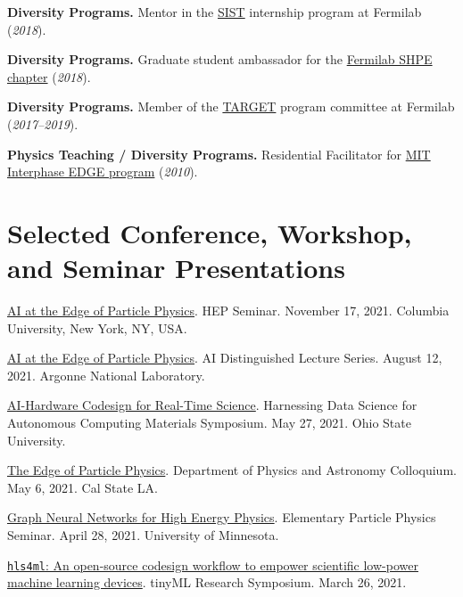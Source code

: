 \documentclass{res}
\newcommand{\MarginText}[1]{\section{#1}\vspace{10pt}}
\begin{document}
\begin{resume}
  \textbf{Diversity Programs.} Mentor in the \href{http://diversity.fnal.gov/sist/}{SIST} internship program at Fermilab (\textit{2018}).

  \textbf{Diversity Programs.} Graduate student ambassador for the \href{http://diversity.fnal.gov/fshpe/}{Fermilab SHPE chapter} (\textit{2018}).

  \textbf{Diversity Programs.} Member of the \href{http://diversity.fnal.gov/target/}{TARGET} program committee at Fermilab (\textit{2017--2019}).

  \textbf{Physics Teaching / Diversity Programs.} Residential Facilitator for \href{http://ome.mit.edu/programs-services/program-overview}{MIT Interphase EDGE program} (\textit{2010}).


  \MarginText{Selected Conference, Workshop, and Seminar Presentations}

  \href{https://physics.columbia.edu/events/hep-seminar-dr-javier-duarte-ucsd}{AI at the Edge of Particle Physics}. HEP Seminar. November 17, 2021. Columbia University, New York, NY, USA.

  \href{https://www.anl.gov/event/ai-at-the-edge-of-particle-physics}{AI at the Edge of Particle Physics}. AI Distinguished Lecture Series. August 12, 2021. Argonne National Laboratory.

  \href{https://tdai.osu.edu/events/acm-symposium-harnessing-data-science-autonomous-computing-materials}{AI-Hardware Codesign for Real-Time Science}. Harnessing Data Science for Autonomous Computing Materials Symposium. May 27, 2021. Ohio State University.

  \href{https://www.calstatela.edu/dept/physics/colloquia-and-events}{The Edge of Particle Physics}. Department of Physics and Astronomy Colloquium. May 6, 2021. Cal State LA.

  \href{https://cse.umn.edu/physics/elementary-particle-physics-elem-part-phys-seminar}{Graph Neural Networks for High Energy Physics}. Elementary Particle Physics Seminar. April 28, 2021. University of Minnesota.

  \href{https://www.tinyml.org/event/research-symposium-2021/}{\texttt{hls4ml}: An open-source codesign workflow to empower scientific low-power machine learning devices}. tinyML Research Symposium. March 26, 2021.


\end{resume}
\end{document}
